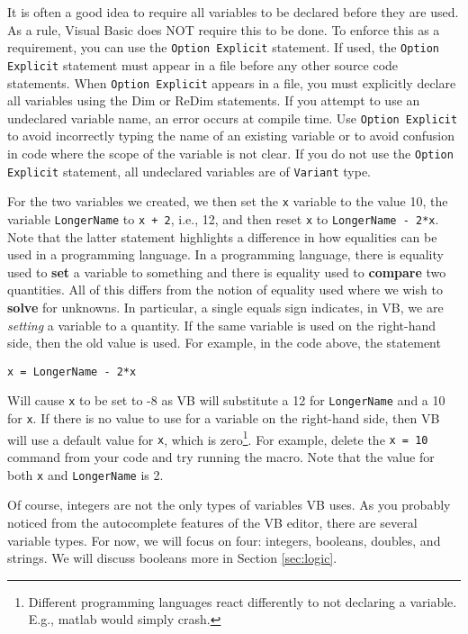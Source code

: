 \documentclass[10pt]{article}
\begin{document}
It is often a good idea to require all variables to be declared before they are used.  As a rule, Visual Basic does NOT require this to be done.  To enforce this as a requirement, you can use the {\tt Option Explicit} statement.  If used, the {\tt Option Explicit} statement must appear in a file before any other source code statements.  When {\tt Option Explicit} appears in a file, you must explicitly declare all variables using the Dim or ReDim statements. If you attempt to use an undeclared variable name, an error occurs at compile time.  Use {\tt Option Explicit} to avoid incorrectly typing the name of an existing variable or to avoid confusion in code where the scope of the variable is not clear.  If you do not use the {\tt Option Explicit} statement, all undeclared variables are of {\tt Variant} type.

For the two variables we created, we then set the {\tt x} variable to the value 10, the variable {\tt LongerName} to {\tt x + 2}, i.e., 12, and then reset {\tt x} to {\tt LongerName - 2*x}. Note that the latter statement highlights a difference in how equalities can be used in a programming language. In a programming language, there is equality used to {\bf set} a variable to something and there is equality used to {\bf compare} two quantities. All of this differs from the notion of equality used where we wish to {\bf solve} for unknowns. In particular, a single equals sign indicates, in VB, we are {\it setting} a variable to a quantity. If the same variable is used on the right-hand side, then the old value is used. For example, in the code above, the statement
\begin{verbatim}
x = LongerName - 2*x
\end{verbatim}
Will cause {\tt x} to be set to -8 as VB will substitute a 12 for {\tt LongerName} and a 10 for {\tt x}.
If there is no value to use for a variable on the right-hand side, then VB will use a default value for {\tt x}, which is zero\footnote{Different programming languages react differently to not declaring a variable. E.g., matlab would simply crash.}. For example, delete the {\tt x = 10} command from your code and try running the macro. Note that the value for both {\tt x} and {\tt LongerName} is 2.

Of course, integers are not the only types of variables VB uses. As you probably noticed from the autocomplete features of the VB editor, there are several variable types. For now, we will focus on four: integers, booleans, doubles, and strings.
We will discuss booleans more in Section \ref{sec:logic}. 
\end{document}
